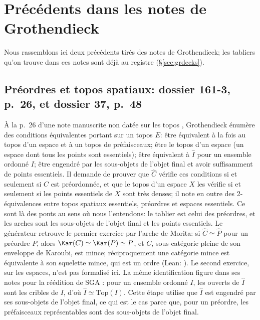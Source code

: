 \section{Précédents dans les notes de Grothendieck}\label{sec:precedents}

Nous rassemblons ici deux précédents tirés des notes de Grothendieck; les tabliers qu'on trouve dans ces notes sont déjà au registre (\S\ref{sec:grdecks}).

\subsection{Préordres et topos spatiaux: dossier 161-3, p.~26, et dossier 37, p.~48}

À la p.~26 d'une note manuscrite non datée sur les topos \cite{grothendieck-161-3}, Grothendieck énumère des conditions équivalentes portant sur un topos $E$: être équivalent à la fois au topos d'un espace et à un topos de préfaisceaux; être le topos d'un espace  (un espace dont tous les points sont essentiels); être équivalent à $\widehat I$ pour un ensemble ordonné $I$; être engendré par les sous-objets de l'objet final et avoir suffisamment de points essentiels. Il demande de prouver que $\widehat C$ vérifie ces conditions si et seulement si $C$ est préordonnée, et que le topos d'un espace $X$ les vérifie si et seulement si les points essentiels de $X$ sont très denses; il note en outre des 2-équivalences entre topos spatiaux essentiels, préordres et espaces essentiels. Ce sont là des ponts au sens où nous l'entendons: le tablier est celui des préordres, et les arches sont les sous-objets de l'objet final et les points essentiels. Le générateur retrouve le premier exercice par l'arche de Morita: si $\widehat C\simeq\widehat P$ pour un préordre $P$, alors $\Kar(C)\simeq\Kar(P)\simeq P$, et $C$, sous-catégorie pleine de son enveloppe de Karoubi, est mince; réciproquement une catégorie mince est équivalente à son squelette mince, qui est un ordre (Lean: ). Le second exercice, sur les espaces, n'est pas formalisé ici. La même identification figure dans ses notes pour la réédition de SGA \cite[p.~48]{grothendieck-37}: pour un ensemble ordonné $I$, les ouverts de $\widehat I$ sont les cribles de $I$, d'où $\widehat I\simeq\mathrm{Top}(I)$. Cette étape utilise que $\widehat I$ est engendré par ses sous-objets de l'objet final, ce qui est le cas parce que, pour un préordre, les préfaisceaux représentables sont des sous-objets de l'objet final.


